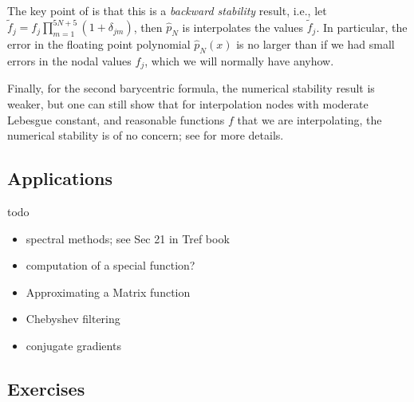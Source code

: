 The key point of  is that this is a {\em backward
stability} result, i.e., let $\tilde{f}_j = f_j\prod_{m = 1}^{5N+5}
(1+\delta_{jm})$, then $\hat{p}_N$ is interpolates the values $\tilde{f}_j$. 
In particular, the error in the floating point polynomial $\hat{p}_N(x)$ 
is no larger than if we had small errors in the nodal values $f_j$, which 
we will normally have anyhow. 

Finally, for the second barycentric formula, the numerical stability result is
weaker, but one can still show that for interpolation nodes with moderate
Lebesgue constant, and reasonable functions $f$ that we are interpolating, the
numerical stability is of no concern; see \cite{Higham2004-fn} for more details.



\subsection{Applications}

\alert{todo}
\begin{itemize}
   \item spectral methods; see Sec 21 in Tref book
   \item computation of a special function?
   \item Approximating a Matrix function
   \item Chebyshev filtering 
   \item conjugate gradients 
\end{itemize}

\subsection{Exercises}
%


   

